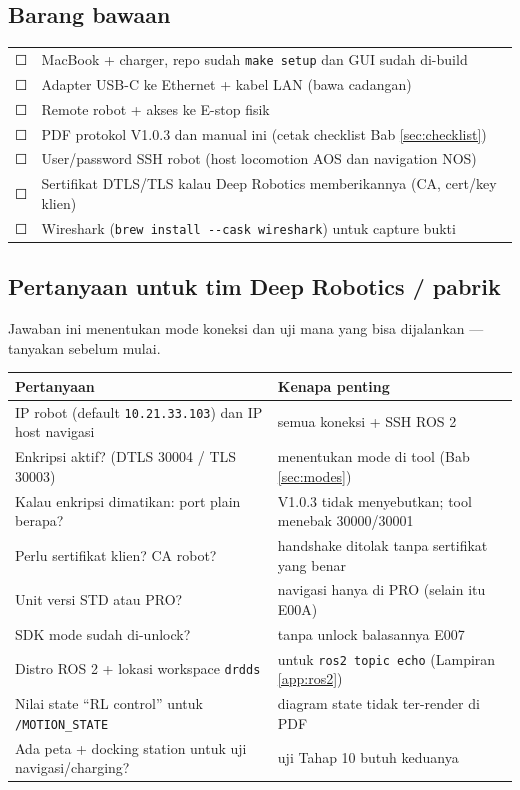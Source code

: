 \documentclass[11pt,a4paper]{article}
\newcommand{\code}[1]{\texttt{#1}}
\newcommand{\cb}{{\symfont\large ☐}}
\begin{document}
\subsection{Barang bawaan}

\begin{tabularx}{\linewidth}{@{}l Y@{}}
\cb & MacBook + charger, repo sudah \code{make setup} dan GUI sudah di-build\\
\cb & Adapter USB-C ke Ethernet + kabel LAN (bawa cadangan)\\
\cb & Remote robot + akses ke E-stop fisik\\
\cb & PDF protokol V1.0.3 dan manual ini (cetak checklist Bab \ref{sec:checklist})\\
\cb & User/password SSH robot (host locomotion AOS dan navigation NOS)\\
\cb & Sertifikat DTLS/TLS kalau Deep Robotics memberikannya (CA, cert/key klien)\\
\cb & Wireshark (\code{brew install -{}-cask wireshark}) untuk capture bukti\\
\end{tabularx}

\subsection{Pertanyaan untuk tim Deep Robotics / pabrik}
Jawaban ini menentukan mode koneksi dan uji mana yang bisa dijalankan --- tanyakan sebelum mulai.

\begin{tabularx}{\linewidth}{@{}L{62mm}Y@{}}
\toprule
\textbf{Pertanyaan} & \textbf{Kenapa penting}\\\midrule
IP robot (default \code{10.21.33.103}) dan IP host navigasi & semua koneksi + SSH ROS 2\\
Enkripsi aktif? (DTLS 30004 / TLS 30003) & menentukan mode di tool (Bab \ref{sec:modes})\\
Kalau enkripsi dimatikan: port plain berapa? & V1.0.3 tidak menyebutkan; tool menebak 30000/30001\\
Perlu sertifikat klien? CA robot? & handshake ditolak tanpa sertifikat yang benar\\
Unit versi STD atau PRO? & navigasi hanya di PRO (selain itu E00A)\\
SDK mode sudah di-unlock? & tanpa unlock balasannya E007\\
Distro ROS 2 + lokasi workspace \code{drdds} & untuk \code{ros2 topic echo} (Lampiran \ref{app:ros2})\\
Nilai state ``RL control'' untuk \code{/MOTION\_STATE} & diagram state tidak ter-render di PDF\\
Ada peta + docking station untuk uji navigasi/charging? & uji Tahap 10 butuh keduanya\\
\bottomrule
\end{tabularx}
\end{document}
